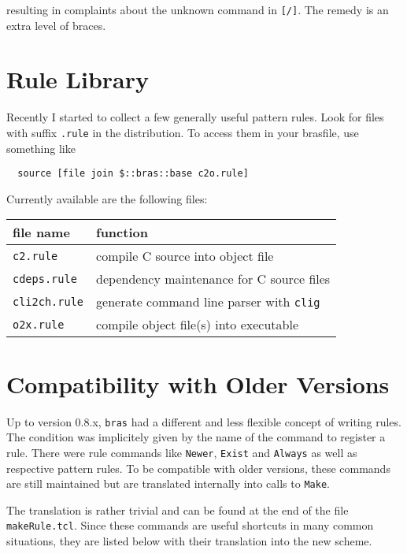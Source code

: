 \documentclass[11pt]{scrartcl}
\newcommand{\bras}{\texttt{bras}}
\begin{document}
resulting in complaints about the unknown command in
\texttt{[/]}. The remedy is an extra level of braces.


\section{Rule Library}

Recently I started to collect a few generally useful pattern rules.
Look for files with suffix \texttt{.rule} in the distribution. To
access them in your brasfile, use something like
\begin{verbatim}
  source [file join $::bras::base c2o.rule]
\end{verbatim}
Currently available are the following files:
\begin{center}
\begin{tabular}{l|l}
file name & function\\\hline
\texttt{c2.rule} & compile C source into object file\\
\texttt{cdeps.rule} & dependency maintenance for C source files\\
\texttt{cli2ch.rule} & generate command line parser with
  \texttt{clig}\cite{Kir00}\\
\texttt{o2x.rule} & compile object file(s) into executable\\
\end{tabular}
\end{center}
\section{Compatibility with Older Versions}

Up to version 0.8.x, \bras{} had a different and less flexible concept
of writing rules. The condition was implicitely given by the name of the
command to register a rule. There were rule commands like
\texttt{Newer}, \texttt{Exist} and \texttt{Always} as well as
respective pattern rules. To be compatible with older versions, these
commands are still maintained but are translated internally into calls 
to \texttt{Make}.

The translation is rather trivial and can be found at the end of the
file \texttt{makeRule.tcl}. Since these commands are useful shortcuts
in many common situations, they are listed below with their
translation into the new scheme.
\end{document}
